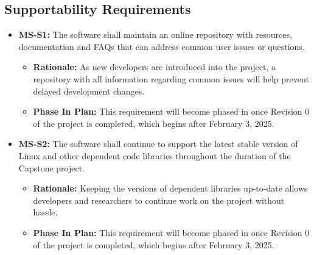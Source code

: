 \documentclass[12pt]{article}
\newcommand{\lips}{\textit{Insert your content here.}}
\begin{document}
\subsection{Supportability Requirements}
\begin{itemize}
  \item \label{MS-S1} \textbf{MS-S1:} The software shall maintain an online repository with resources, documentation and FAQs that can address common user issues or questions.
  \begin{itemize}
    \item \textbf{Rationale:} As new developers are introduced into the project, a repository with all information regarding common issues will help prevent delayed development changes.
    \item \textbf{Phase In Plan:} This requirement will become phased in once Revision 0 of the project is completed, which begins after February 3, 2025. 
  \end{itemize}
  \item \label{MS-S2} \textbf{MS-S2:} The software shall continue to support the latest stable version of Linux and other dependent code libraries throughout the duration of the Capstone project.
  \begin{itemize}
    \item \textbf{Rationale:} Keeping the versions of dependent libraries up-to-date allows developers and researchers to continue work on the project without hassle.
    \item \textbf{Phase In Plan:} This requirement will become phased in once Revision 0 of the project is completed, which begins after February 3, 2025. 
  \end{itemize}
\end{itemize}
\end{document}
